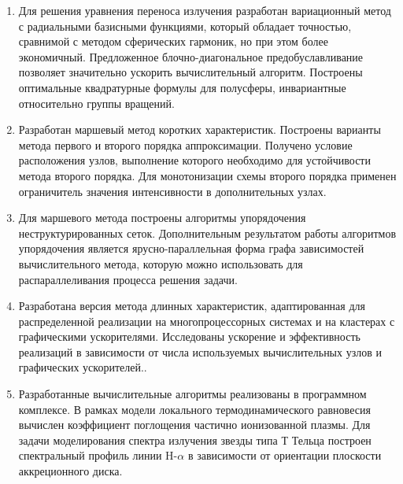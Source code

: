\begin{enumerate}
  \item Для решения уравнения переноса излучения разработан вариационный метод с радиальными базисными функциями, который обладает точностью, сравнимой с методом сферических гармоник, но при этом более экономичный. Предложенное блочно-диагональное предобуславливание позволяет значительно ускорить вычислительный алгоритм. Построены оптимальные квадратурные формулы для полусферы, инвариантные относительно группы вращений.
  \item Разработан маршевый метод коротких характеристик. Построены варианты метода первого и второго порядка аппроксимации. Получено условие расположения узлов, выполнение которого необходимо для устойчивости метода второго порядка. Для монотонизации схемы второго порядка применен ограничитель значения интенсивности в дополнительных узлах.
  \item Для маршевого метода построены алгоритмы упорядочения неструктурированных сеток. Дополнительным результатом работы алгоритмов упорядочения является ярусно-параллельная форма графа зависимостей вычислительного метода, которую можно использовать для распараллеливания процесса решения задачи. 
  \item Разработана версия метода длинных характеристик, адаптированная для распределенной реализации на многопроцессорных системах и на кластерах с графическими ускорителями. Исследованы ускорение и эффективность реализаций в зависимости от числа используемых вычислительных узлов и графических ускорителей..
  \item Разработанные вычислительные алгоритмы реализованы в программном комплексе. В рамках модели локального термодинамического равновесия вычислен коэффициент поглощения частично ионизованной плазмы. Для задачи моделирования спектра излучения звезды типа Т Тельца построен спектральный профиль линии H-$\alpha$ в зависимости от ориентации плоскости аккреционного диска.
\end{enumerate}
